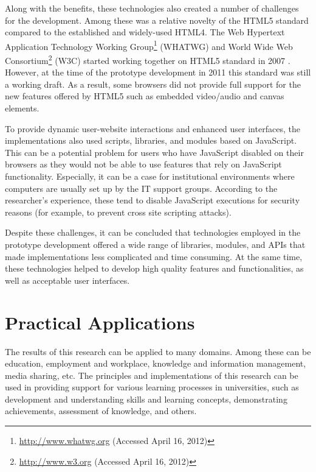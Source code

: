 Along with the benefits, these technologies also created a number of challenges
for the development. Among these was a relative novelty of the HTML5 standard
compared to the established and widely-used HTML4. The Web Hypertext Application
Technology Working Group\footnote{\url{http://www.whatwg.org} (Accessed April
16, 2012)} (WHATWG) and World Wide Web Consortium\footnote{\url{http://www.w3.org}  (Accessed April 16,
2012)} (W3C) started working together on HTML5 standard in 2007
\citep{WorldWideWebConsortium2012}. However, at the time of the prototype
development in 2011 this standard was still a working draft. As a result, some
browsers did not provide full support for the new features offered by HTML5 such
as embedded video/audio and canvas elements.

To provide dynamic user-website interactions and enhanced user interfaces, the
implementations also used scripts, libraries, and modules based on
JavaScript. This can be a potential problem for users who have JavaScript
disabled on their browsers as they would not be able to use features that rely
on JavaScript functionality. Especially, it can be a case for institutional
environments where computers are usually set up by the IT support groups.
According to the researcher's experience, these tend to disable JavaScript
executions for security reasons (for example, to prevent cross site scripting
attacks).

Despite these challenges, it can be concluded that technologies employed in the
prototype development offered a wide range of libraries, modules, and APIs
that made implementations less complicated and time consuming. At the same time,
these technologies helped to develop high quality features and functionalities,
as well as acceptable user interfaces.

\section{Practical Applications}

The results of this research can be applied to many domains. Among these can be
education, employment and workplace, knowledge and information management, media
sharing, etc. The principles and implementations of this research can be used
in providing support for various learning processes in universities, such as
development and understanding skills and learning concepts, demonstrating
achievements, assessment of knowledge, and others.

